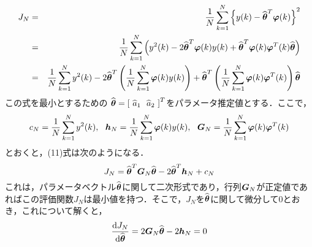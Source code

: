 \documentclass[a4paper,11pt]{jarticle}
\begin{document}
\begin{enumerate}
\begin{eqnarray}
 J_N & = &  \dfrac{1}{N} \sum^N_{k=1} \left\{ y(k) - \widehat{\mbox{\boldmath$\theta$}}^T \mbox{\boldmath$\varphi$}(k) \right\}^2 \nonumber \\
     & = & \dfrac{1}{N} \sum^N_{k=1} \left( y^2(k) - 2\widehat{\mbox{\boldmath$\theta$}}^T \mbox{\boldmath$\varphi$}(k) y(k) + \widehat{\mbox{\boldmath$\theta$}}^T \mbox{\boldmath$\varphi$}(k) \mbox{\boldmath$\varphi$}^T(k) \widehat{\mbox{\boldmath$\theta$}} \right) \nonumber \\
     & = & \dfrac{1}{N} \sum^N_{k=1} y^2(k) - 2 \widehat{\mbox{\boldmath$\theta$}}^T \left(\dfrac{1}{N} \sum^N_{k=1} \mbox{\boldmath$\varphi$}(k) y(k) \right) + \widehat{\mbox{\boldmath$\theta$}}^T \left(\dfrac{1}{N} \sum^N_{k=1} \mbox{\boldmath$\varphi$}(k) \mbox{\boldmath$\varphi$}^T(k) \right) \widehat{\mbox{\boldmath$\theta$}}
\end{eqnarray}
この式を最小とするための$ ~ \widehat{\mbox{\boldmath$\theta$}} = \left[ ~ \widehat{a}_1 ~~ \widehat{a}_2 ~ \right]^T $をパラメータ推定値とする．ここで，
\begin{equation}
 c_N = \dfrac{1}{N} \sum^N_{k=1}y^2(k), ~~ \mbox{\boldmath$h$}_N = \dfrac{1}{N} \sum^N_{k=1} \mbox{\boldmath$\varphi$}(k) y(k), ~~ \mbox{\boldmath$G$}_N = \dfrac{1}{N} \sum^N_{k=1} \mbox{\boldmath$\varphi$}(k) \mbox{\boldmath$\varphi$}^T(k)
\label{12}
\end{equation}
とおくと，(11)式は次のようになる．
\begin{equation}
 J_N = \widehat{\mbox{\boldmath$\theta$}}^T \mbox{\boldmath$G$}_N \widehat{\mbox{\boldmath$\theta$}} - 2\widehat{\mbox{\boldmath$\theta$}}^T \mbox{\boldmath$h$}_N + c_N
\end{equation}
これは，パラメータベクトル$ \widehat{\mbox{\boldmath$\theta$}} $に関して二次形式であり，行列$ \mbox{\boldmath$G$}_N $が正定値であればこの評価関数$ J_N $は最小値を持つ．そこで，$ J_N $を$ \widehat{\mbox{\boldmath$\theta$}} $に関して微分して$ 0 $とおき，これについて解くと，
\begin{equation}
 \dfrac{{\rm d}J_N}{{\rm d}\widehat{\mbox{\boldmath$\theta$}}} = 2\mbox{\boldmath$G$}_N \widehat{\mbox{\boldmath$\theta$}} - 2\mbox{\boldmath$h$}_N = 0
\end{equation}

\end{enumerate}
\end{document}
